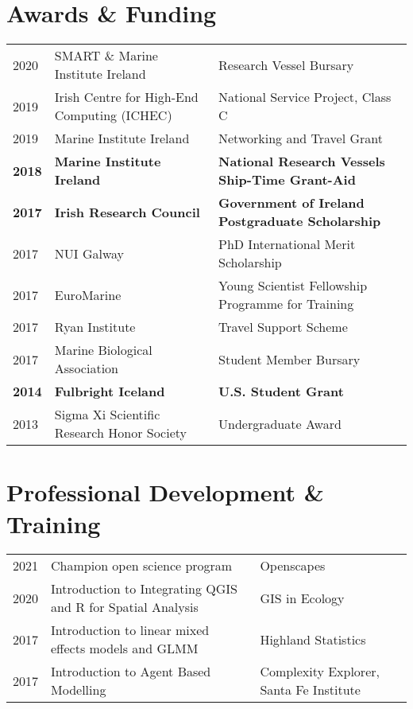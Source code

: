 \documentclass[a4paper]{deedy-resume} %
\begin{document}
\begin{flushleft}

\sectionspace



\section{Awards \& Funding}

\begin{tabular}{ l l l }
2020 & SMART \& Marine Institute Ireland & Research Vessel Bursary \\
2019 & Irish Centre for High-End Computing (ICHEC) & National Service Project, Class C \\
2019 & Marine Institute Ireland & Networking and Travel Grant \\
\textbf{2018} & \textbf{Marine Institute Ireland} & \textbf{National Research Vessels Ship-Time Grant-Aid} \\
\textbf{2017} & \textbf{Irish Research Council} & \textbf{Government of Ireland Postgraduate Scholarship} \\
2017 & NUI Galway & PhD International Merit Scholarship \\
2017 & EuroMarine & Young Scientist Fellowship Programme for Training \\
2017 & Ryan Institute & Travel Support Scheme \\
2017 & Marine Biological Association & Student Member Bursary \\
\textbf{2014} & \textbf{Fulbright Iceland} & \textbf{U.S. Student Grant} \\
2013 & Sigma Xi Scientific Research Honor Society & Undergraduate Award

\end{tabular}

\sectionspace %


\sectionspace %

\section{Professional Development \& Training}

\begin{tabular}{ l l l }
2021 & Champion open science program & Openscapes \\
2020 & Introduction to Integrating QGIS and R for Spatial Analysis & GIS in Ecology \\
2017 & Introduction to linear mixed effects models and GLMM & Highland Statistics \\
2017 & Introduction to Agent Based Modelling & Complexity Explorer, Santa Fe Institute \\


\end{tabular}
\end{flushleft}
\end{document}
